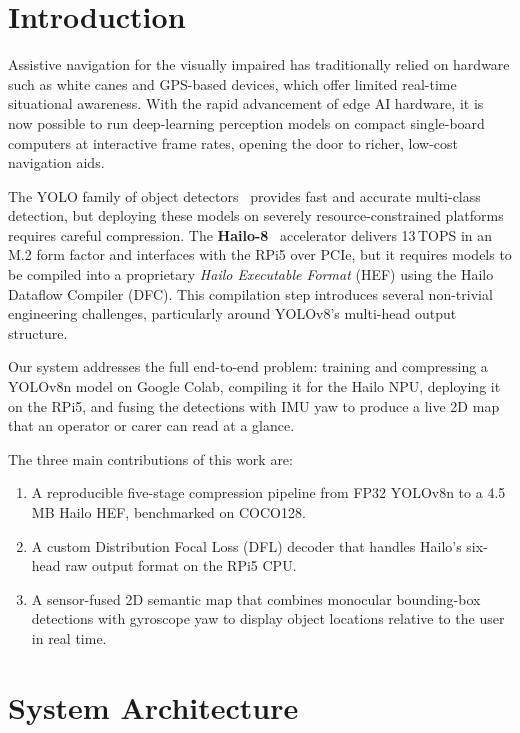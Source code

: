 \documentclass[journal, onecolumn]{IEEEtran}
\begin{document}
\section{Introduction}
\label{sec:intro}

Assistive navigation for the visually impaired has traditionally relied on hardware such as white canes and GPS-based devices, which offer limited real-time situational awareness. With the rapid advancement of edge AI hardware, it is now possible to run deep-learning perception models on compact single-board computers at interactive frame rates, opening the door to richer, low-cost navigation aids.

The YOLO family of object detectors~\cite{redmon2016you,jocher2023yolov8} provides fast and accurate multi-class detection, but deploying these models on severely resource-constrained platforms requires careful compression. The \textbf{Hailo-8}~\cite{hailo8} accelerator delivers 13\,TOPS in an M.2 form factor and interfaces with the RPi5 over PCIe, but it requires models to be compiled into a proprietary \emph{Hailo Executable Format} (HEF) using the Hailo Dataflow Compiler (DFC). This compilation step introduces several non-trivial engineering challenges, particularly around YOLOv8's multi-head output structure.

Our system addresses the full end-to-end problem: training and compressing a YOLOv8n model on Google Colab, compiling it for the Hailo NPU, deploying it on the RPi5, and fusing the detections with IMU yaw to produce a live 2D map that an operator or carer can read at a glance.

The three main contributions of this work are:
\begin{enumerate}
  \item A reproducible five-stage compression pipeline from FP32 YOLOv8n to a 4.5\,MB Hailo HEF, benchmarked on COCO128.
  \item A custom Distribution Focal Loss (DFL) decoder that handles Hailo's six-head raw output format on the RPi5 CPU.
  \item A sensor-fused 2D semantic map that combines monocular bounding-box detections with gyroscope yaw to display object locations relative to the user in real time.
\end{enumerate}

\section{System Architecture}
\label{sec:arch}
\end{document}

